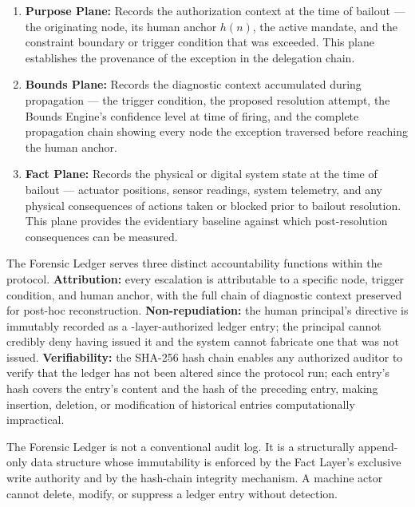 \begin{enumerate}\itemsep=0pt
\item \textbf{Purpose Plane:} Records the authorization context at the time of bailout --- the originating node, its human anchor $h(n)$, the active mandate, and the constraint boundary or trigger condition that was exceeded. This plane establishes the provenance of the exception in the delegation chain.

\item \textbf{Bounds Plane:} Records the diagnostic context accumulated during propagation --- the trigger condition, the proposed resolution attempt, the Bounds Engine's confidence level at time of firing, and the complete propagation chain showing every node the exception traversed before reaching the human anchor.

\item \textbf{Fact Plane:} Records the physical or digital system state at the time of bailout --- actuator positions, sensor readings, system telemetry, and any physical consequences of actions taken or blocked prior to bailout resolution. This plane provides the evidentiary baseline against which post-resolution consequences can be measured.
\end{enumerate}

The Forensic Ledger serves three distinct accountability functions within the protocol. \textbf{Attribution:} every escalation is attributable to a specific node, trigger condition, and human anchor, with the full chain of diagnostic context preserved for post-hoc reconstruction. \textbf{Non-repudiation:} the human principal's directive is immutably recorded as a \purpose-layer-authorized ledger entry; the principal cannot credibly deny having issued it and the system cannot fabricate one that was not issued. \textbf{Verifiability:} the SHA-256 hash chain enables any authorized auditor to verify that the ledger has not been altered since the protocol run; each entry's hash covers the entry's content and the hash of the preceding entry, making insertion, deletion, or modification of historical entries computationally impractical.

The Forensic Ledger is not a conventional audit log. It is a structurally append-only data structure whose immutability is enforced by the Fact Layer's exclusive write authority and by the hash-chain integrity mechanism. A machine actor cannot delete, modify, or suppress a ledger entry without detection.

